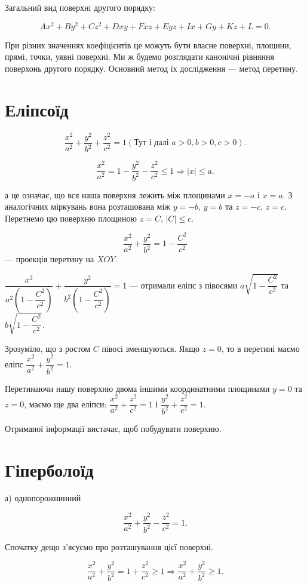 Загальний вид поверхні другого порядку:

$$Ax^2 + By^2 + Cz^2 + Dxy + Fxz + Eyz + Ix + Gy + Kz + L = 0.$$

При різних значеннях коефіцієнтів це можуть бути власне поверхні,
площини, прямі, точки, уявні поверхні. Ми ж будемо розглядати канонічні
рівняння поверхонь другого порядку. Основний метод їх дослідження ---
метод перетину.


\section{Еліпсоїд}

$$\dfrac{x^2}{a^2} + \dfrac{y^2}{b^2} + \dfrac{z^2}{c^2} = 1 (\text{Тут і далі } a  > 0, b > 0 , c > 0).$$

$$\dfrac{x^2}{a^2} = 1 - \dfrac{y^2}{b^2} - \dfrac{z^2}{c^2} \leqslant 1 \Rightarrow |x| \leqslant a.$$


а це означає, що вся наша поверхня лежить між площинами $x = - a$ і
$x = a$. З аналогічних міркувань вона розташована між $y = -b$, $y = b$ та $z = -c$,
$z = c$. Перетнемо цю поверхню площиною $z = C$, $|C| \leqslant c$.

$$\dfrac{x^2}{a^2} + \dfrac{y^2}{b^2} = 1 - \dfrac{C^2}{c^2}$$ --- проекція перетину на $XOY$.

$\dfrac{x^2}{a^2\left(1-\dfrac{C^2}{c^2}\right)} + \dfrac{y^2}{b^2\left(1-\dfrac{C^2}{c^2}\right)} = 1$ ---
отримали еліпс з півосями $a\sqrt{1 - \dfrac{C^2}{c^2}}$ та $b\sqrt{1 - \dfrac{C^2}{c^2}}$.


Зрозуміло, що з ростом $C$ півосі зменшуються. Якщо $z = 0$, то в
перетині маємо еліпс $\dfrac{x^2}{a^2} + \dfrac{y^2}{b^2} = 1$.


Перетинаючи нашу поверхню двома іншими координатними площинами
$y = 0$ та $z = 0$, маємо ще два еліпси: $\dfrac{x^2}{a^2} + \dfrac{z^2}{c^2} = 1$
і $\dfrac{y^2}{b^2} + \dfrac{z^2}{c^2} = 1$.

Отриманої інформації вистачає,
щоб побудувати поверхню.


\section{Гіперболоїд}

а) однопорожнинний

$$\dfrac{x^2}{a^2} + \dfrac{y^2}{b^2} - \dfrac{z^2}{c^2} = 1.$$

Спочатку дещо з’ясуємо про розташування цієї поверхні.

$$\dfrac{x^2}{a^2} + \dfrac{y^2}{b^2} = 1 + \dfrac{z^2}{c^2} \geqslant 1 \Rightarrow \dfrac{x^2}{a^2} + \dfrac{y^2}{b^2} \geqslant 1.$$

